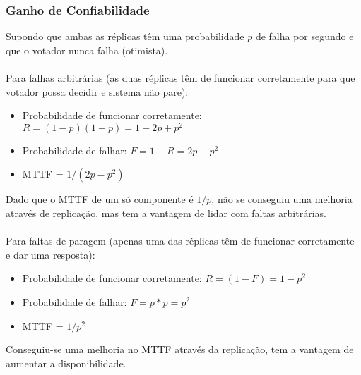 \documentclass[10pt,a4paper]{report}
\begin{document}
\subsubsection{Ganho de Confiabilidade}
Supondo que ambas as réplicas têm uma probabilidade $p$ de falha por segundo e que o votador nunca falha (otimista).\\
\\
Para falhas arbitrárias (as duas réplicas têm de funcionar corretamente para que votador possa decidir e sistema não pare):
\begin{itemize}
\item Probabilidade de funcionar corretamente: $R = (1 - p) (1 - p) = 1 - 2p + p^2$
\item Probabilidade de falhar: $F = 1 - R = 2p - p^2$
\item MTTF = $1 / (2p - p^2)$
\end{itemize}
Dado que o MTTF de um só componente é $1/p$, não se conseguiu uma melhoria através de replicação, mas tem a vantagem de lidar com faltas arbitrárias.\\
\\
Para faltas de paragem (apenas uma das réplicas têm de funcionar corretamente e dar uma resposta):
\begin{itemize}
\item Probabilidade de funcionar corretamente: $R = (1 - F) = 1 - p^2$
\item Probabilidade de falhar: $F = p*p = p^2$
\item MTTF = $1 / p^2$
\end{itemize}
Conseguiu-se uma melhoria no MTTF através da replicação, tem a vantagem de aumentar a disponibilidade.
\end{document}
